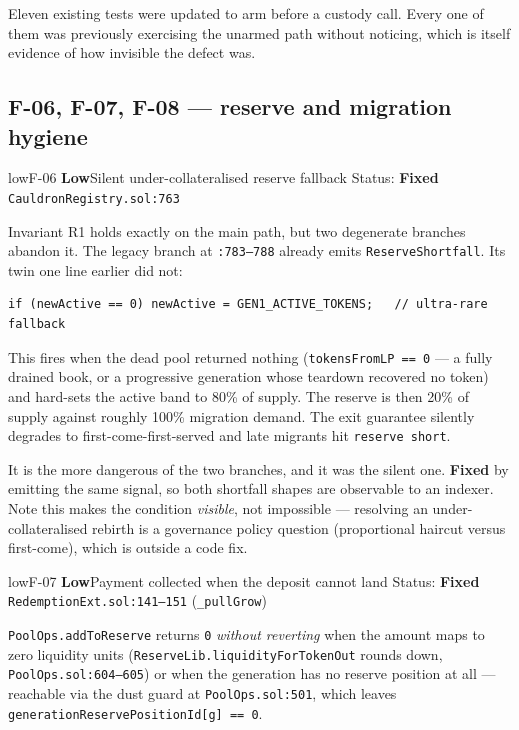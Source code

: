\documentclass[11pt,a4paper]{article}
\newcommand{\code}[1]{\texttt{\small #1}}
\newcommand{\fileref}[1]{\texttt{\scriptsize #1}}
\begin{document}
Eleven existing tests were updated to arm before a custody call. Every one of them
was previously exercising the unarmed path without noticing, which is itself
evidence of how invisible the defect was.

\newpage
\subsection{F-06, F-07, F-08 --- reserve and migration hygiene}

\begin{findingbox}{low}{F-06 \quad \textbf{Low}\quad Silent under-collateralised reserve fallback \quad Status: \textbf{Fixed}}
\fileref{CauldronRegistry.sol:763}
\end{findingbox}

Invariant R1 holds exactly on the main path, but two degenerate branches abandon
it. The legacy branch at \fileref{:783--788} already emits \code{ReserveShortfall}.
Its twin one line earlier did not:
\begin{lstlisting}
if (newActive == 0) newActive = GEN1_ACTIVE_TOKENS;   // ultra-rare fallback
\end{lstlisting}
This fires when the dead pool returned nothing (\code{tokensFromLP == 0} --- a fully
drained book, or a progressive generation whose teardown recovered no token) and
hard-sets the active band to 80\% of supply. The reserve is then 20\% of supply
against roughly 100\% migration demand. The exit guarantee silently degrades to
first-come-first-served and late migrants hit \code{reserve short}.

It is the more dangerous of the two branches, and it was the silent one.
\textbf{Fixed} by emitting the same signal, so both shortfall shapes are
observable to an indexer. Note this makes the condition \emph{visible}, not
impossible --- resolving an under-collateralised rebirth is a governance policy
question (proportional haircut versus first-come), which is outside a code fix.

\begin{findingbox}{low}{F-07 \quad \textbf{Low}\quad Payment collected when the deposit cannot land \quad Status: \textbf{Fixed}}
\fileref{RedemptionExt.sol:141--151} (\code{\_pullGrow})
\end{findingbox}

\code{PoolOps.addToReserve} returns \code{0} \emph{without reverting} when the
amount maps to zero liquidity units (\code{ReserveLib.liquidityForTokenOut} rounds
down, \fileref{PoolOps.sol:604--605}) or when the generation has no reserve
position at all --- reachable via the dust guard at \fileref{PoolOps.sol:501},
which leaves \code{generationReservePositionId[g] == 0}.
\end{document}
